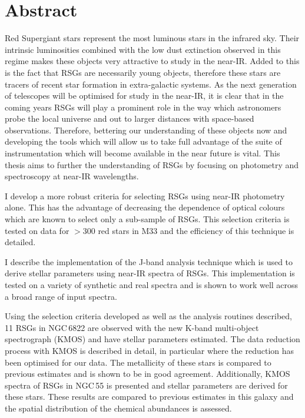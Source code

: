 \chapter{Abstract}

Red Supergiant stars represent the most luminous stars in the infrared sky.
Their intrinsic luminosities combined with the low dust extinction observed
in this regime makes these objects very attractive to study in the near-IR.
Added to this is the fact that RSGs are necessarily young objects,
therefore these stars are tracers of recent star formation in extra-galactic
systems.
As the next generation of telescopes will be optimised for study in the near-IR,
it is clear that in the coming years RSGs will play a prominent role in the way
which astronomers probe the local universe and out to larger distances with
space-based observations.
Therefore, bettering our understanding of these objects now and developing the
tools which will allow us to take full advantage of the suite of instrumentation
which will become available in the near future is vital.
This thesis aims to further the understanding of RSGs by focusing on photometry
and spectroscopy at near-IR wavelengths.

I develop a more robust criteria for selecting RSGs using near-IR photometry alone.
This has the advantage of decreasing the dependence of optical colours which are
known to select only a sub-sample of RSGs.
This selection criteria is tested on data for $>$300 red stars in M33 and the
efficiency of this technique is detailed.

I describe the implementation of the J-band analysis technique which is used to
derive stellar parameters using near-IR spectra of RSGs.
This implementation is tested on a variety of synthetic and real spectra and
is shown to work well across a broad range of input spectra.


Using the selection criteria developed as well as the analysis routines described,
11 RSGs in NGC\,6822 are observed with the new K-band multi-object spectrograph
(KMOS) and have stellar parameters estimated.
The data reduction process with KMOS is described in detail, in particular
where the reduction has been optimised for our data.
The metallicity of these stars is compared to previous estimates and is shown
to be in good agreement.
Additionally, KMOS spectra of RSGs in NGC\,55 is presented and stellar parameters
are derived for these stars.
These results are compared to previous estimates in this galaxy and the spatial
distribution of the chemical abundances is assessed.



